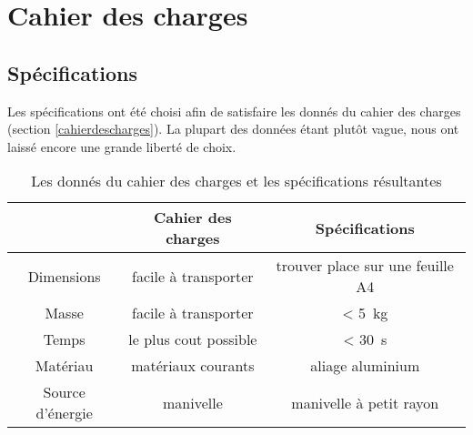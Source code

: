 \chapter{Cahier des charges}
 
\section{Spécifications}
Les spécifications ont été choisi afin de satisfaire les donnés du cahier des charges (section \ref{cahierdescharges}).  La plupart des données étant plutôt vague, nous ont laissé encore une grande liberté de choix. 

\begin{table}[htbp]
    \centering
    \begin{tabular}{|c|c|c|}
        \hline
         & \textbf{Cahier des charges} & \textbf{Spécifications} \\
        \hline
        Dimensions & facile à transporter & trouver place sur une feuille A4 \\
        \hline
        Masse & facile à transporter & \SI{< 5}{\kilo\gram} \\
        \hline
        Temps & le plus cout possible & \SI{< 30}{\second} \\
        \hline
        Matériau & matériaux courants & aliage aluminium \\
        \hline
        Source d'énergie & manivelle & manivelle à petit rayon\\
        \hline
    \end{tabular}
    \caption{Les donnés du cahier des charges et les spécifications résultantes}
\end{table}

